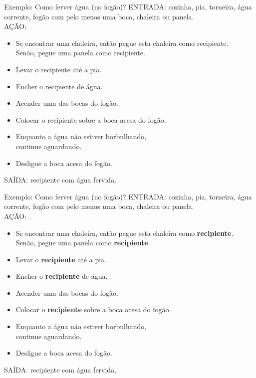 \documentclass[hyperref={pdfpagelabels=false}]{beamer}
\begin{document}
\begin{frame}{Exemplo: Como ferver água (no fogão)?}
  ENTRADA: cozinha, pia, torneira, água corrente, fogão com pelo menos uma boca, chaleira ou panela.\\
  AÇÃO: 
  \begin{itemize}
  \item \alert{Se} encontrar uma chaleira, então pegue esta chaleira como recipiente. \\
		\alert{Senão}, pegue uma panela como recipiente.
  \item Levar o recipiente até a pia.
  \item Encher o recipiente de água.
  \item Acender uma das bocas do fogão.
  \item Colocar o recipiente sobre a boca acesa do fogão.
  \item \alert{Enquanto} a água não estiver borbulhando, \\
		\alert{continue} aguardando.
  \item Desligue a boca acesa do fogão.
  \end{itemize}
	SAÍDA: recipiente com água fervida.
\end{frame}

\begin{frame}{Exemplo: Como ferver água (no fogão)?}
  ENTRADA: cozinha, pia, torneira, água corrente, fogão com pelo menos uma boca, chaleira ou panela.\\
  AÇÃO: 
  \begin{itemize}
	\item Se encontrar uma chaleira, então pegue esta chaleira como \textbf{recipiente}. \\
		Senão, pegue uma panela como \textbf{recipiente}.
  \item Levar o \textbf{recipiente} até a pia.
  \item Encher o \textbf{recipiente} de água.
  \item Acender uma das bocas do fogão.
  \item Colocar o \textbf{recipiente} sobre a boca acesa do fogão.
  \item Enquanto a água não estiver borbulhando, \\
		continue aguardando.
  \item Desligue a boca acesa do fogão.
  \end{itemize}
  SAÍDA: recipiente com água fervida.
\end{frame}
\end{document}
